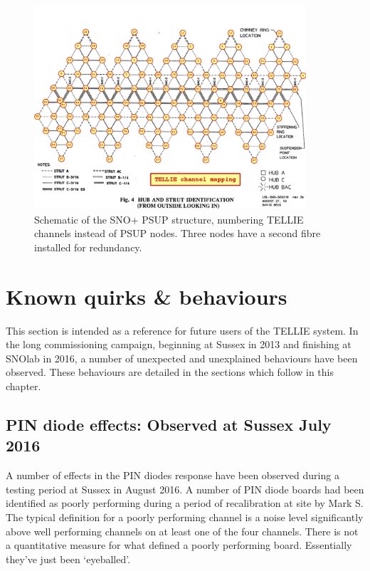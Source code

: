 \documentclass[12pt]{report}
\begin{document}
\begin{figure}[htp]
	\begin{center}
		\includegraphics[width=0.9\textwidth]{NodeChannelMap}
		\caption{Schematic of the SNO+ PSUP structure, numbering TELLIE channels instead of PSUP nodes. Three nodes have a second fibre installed for redundancy.}
		\label{fig:NodeChannelMap}
	\end{center}
\end{figure}

\chapter{Known quirks \& behaviours}
\label{chap:Quirks}
This section is intended as a reference for future users of the TELLIE system. In the long commissioning campaign, beginning at Sussex in 2013 and finishing at SNOlab in 2016, a number of unexpected and unexplained behaviours have been observed. These behaviours are detailed in the sections which follow in this chapter. 

\section{PIN diode effects: Observed at Sussex July 2016}
A number of effects in the PIN diodes response have been observed during a testing period at Sussex in August 2016. A number of PIN diode boards had been identified as poorly performing during a period of recalibration at site by Mark S. The typical definition for a poorly performing channel is a noise level significantly above well performing channels on at least one of the four channels. There is not a quantitative measure for what defined a poorly performing board. Essentially they've just been `eyeballed'.
\end{document}
